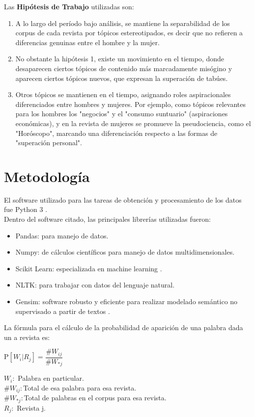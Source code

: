 \documentclass[a4paper]{article}
\begin{document}
Las \textbf{Hip\'otesis de Trabajo} utilizadas son:
\begin{enumerate}
\item A lo largo del per\'iodo bajo an\'alisis, se mantiene la separabilidad de los corpus de cada revista por t\'opicos estereotipados, es decir que no refieren a diferencias genuinas entre el hombre y la mujer.
\item No obstante la hip\'otesis 1, existe un movimiento en el tiempo, donde desaparecen ciertos t\'opicos de contenido m\'as marcadamente mis\'ogino y aparecen ciertos t\'opicos nuevos, que expresan la superaci\'on de tab\'ues. 
\item Otros t\'opicos se mantienen en el tiempo, asignando roles aspiracionales diferenciados entre hombres y mujeres. Por ejemplo, como t\'opicos relevantes para los hombres los "negocios" y el "consumo suntuario" (aspiraciones econ\'omicas), y en la revista de mujeres se promueve la pseudociencia, como el "Hor\'oscopo", marcando una diferenciaci\'on respecto a las formas de "superaci\'on personal".
\end{enumerate}

\section{Metodolog\'ia}

El software utilizado para las tareas de obtenci\'on y procesamiento de los datos fue Python 3 \cite{python}.\\
Dentro del software citado, las principales librer\'ias utilizadas fueron:\\
\begin{itemize}
\item Pandas: para manejo de datos. \cite{pandas}
\item Numpy: de c\'alculos cient\'ificos para manejo de datos multidimensionales. \cite{numpy}
\item Scikit Learn: especializada en machine learning \cite{scikit}.
\item NLTK: para trabajar con datos del lenguaje natural. \cite{nltk}
\item Gensim: software robusto y eficiente para realizar modelado sem\'antico no supervisado a partir de textos \cite{gensim}.

\end{itemize}

La f\'ormula para el cálculo de la probabilidad de aparici\'on de una palabra dada un a revista es:\\
\begin{center}
$\text{P}[W_i|R_j] = \dfrac{\#W_{ij}}{\#W_{*j}}$
\end{center}
$W_i:$ Palabra en particular.\\
$\#W_{ij}:$Total de esa palabra para esa revista. \\
$\#W_{*j}:$Total de palabras en el corpus para esa revista.\\
$R_j:$ Revista j.\\
\end{document}
